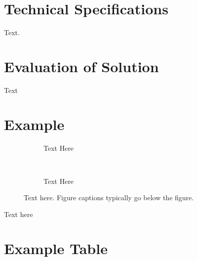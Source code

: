 \documentclass[a4paper, 12pt, english, conference]{IEEEtran}
\begin{document}
    \section{Technical Specifications}
        \label{sec: Technical Specifications}

        Text.


    \section{Evaluation of Solution}
        \label{sec: Evaluation of Solution}

        Text



    \clearpage




    \clearpage


    \Appendices

        \section{Example}\label{app:example}
            \begin{figure}[!h]
                \begin{subfigure}[t]{0.45\textwidth}
                    \centering
                    \caption{Text Here}
                    \label{subfig: example1}
                \end{subfigure}
                ~
                \begin{subfigure}[t]{0.45\textwidth}
                    \centering
                    \caption{Text Here}
                    \label{subfig: example2}
                \end{subfigure}
                

                \caption{Text here. Figure captions typically go below the figure.}
                \label{fig: example}
            \end{figure}

            \FloatBarrier

            Text here


        \section{Example Table}
            \label{app: example table}
\end{document}
